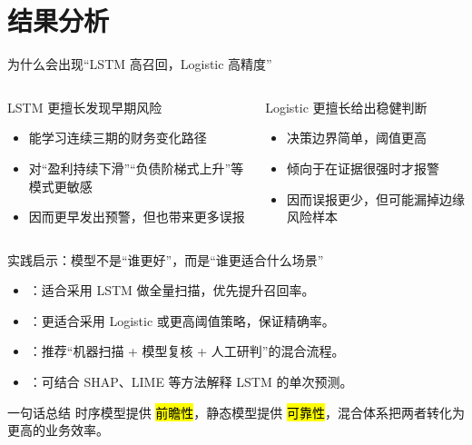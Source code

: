 \section{结果分析}

\begin{frame}{为什么会出现“LSTM 高召回，Logistic 高精度”}
  \begin{columns}[T,onlytextwidth]
    \begin{block}{LSTM 更擅长发现早期风险}
      \begin{itemize}
        \item 能学习连续三期的财务变化路径
        \item 对“盈利持续下滑”“负债阶梯式上升”等模式更敏感
        \item 因而更早发出预警，但也带来更多误报
      \end{itemize}
    \end{block}

    \begin{exampleblock}{Logistic 更擅长给出稳健判断}
      \begin{itemize}
        \item 决策边界简单，阈值更高
        \item 倾向于在证据很强时才报警
        \item 因而误报更少，但可能漏掉边缘风险样本
      \end{itemize}
    \end{exampleblock}
  \end{columns}
\end{frame}

\begin{frame}{实践启示：模型不是“谁更好”，而是“谁更适合什么场景”}
  \begin{itemize}
    \item {}：适合采用 LSTM 做全量扫描，优先提升召回率。
    \item {}：更适合采用 Logistic 或更高阈值策略，保证精确率。
    \item {}：推荐“机器扫描 + 模型复核 + 人工研判”的混合流程。
    \item {}：可结合 SHAP、LIME 等方法解释 LSTM 的单次预测。
  \end{itemize}

  \begin{block}{一句话总结}
    时序模型提供 \hl{前瞻性}，静态模型提供 \hl{可靠性}，混合体系把两者转化为更高的业务效率。
  \end{block}
\end{frame}
